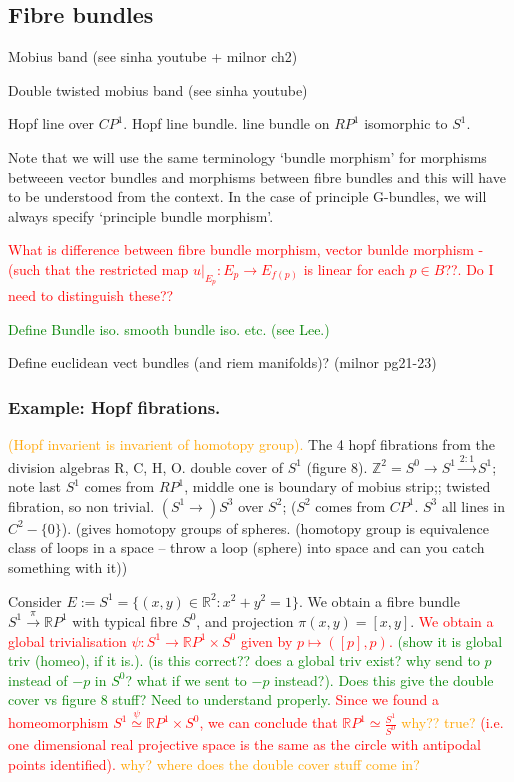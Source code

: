 \documentclass[a4paper]{article}
\theoremstyle{definition} \newtheorem*{definition}{Definition}
\theoremstyle{definition} \newtheorem*{definitions}{Definitions}
\theoremstyle{plain} \newtheorem{theorem}{Theorem}[section]
\theoremstyle{plain} \newtheorem{proposition}[theorem]{Proposition}
\theoremstyle{plain} \newtheorem{corollary}[theorem]{Corollary}
\theoremstyle{plain} \newtheorem{lemma}[theorem]{Lemma}
\theoremstyle{plain} \newtheorem{example}[theorem]{Example}
\newcommand{\checkCorrect}[1]{\textcolor{red}{#1}}
\newcommand{\understandBetter}[1]{\textcolor{orange}{#1}}
\newcommand{\question}[1]{\textcolor{orange}{#1}}
\newcommand{\finish}[1]{\textcolor{green}{#1}}
\newcommand{\realnos}{\mathbb{R}}
\begin{document}
\subsection{Fibre bundles}
Mobius band (see sinha youtube + milnor ch2)

Double twisted mobius band (see sinha youtube)

Hopf line over $CP^1$. 
Hopf line bundle. 
line bundle on $RP^1$ isomorphic to $S^1$. 


Note that we will use the same terminology `bundle morphism' for morphisms betweeen vector bundles and morphisms between fibre bundles and this will have to be understood from the context. In the case of principle G-bundles, we will always specify `principle bundle morphism'.


\checkCorrect{What is difference between fibre bundle morphism, vector bunlde morphism - (such that the restricted map $u\vert_{E_p}: E_p \rightarrow E_{f(p)}$ is linear for each $p\in B$??. Do I need to distinguish these??}

\finish{Define Bundle iso. smooth bundle iso. etc. (see Lee.)}


Define euclidean vect bundles (and riem manifolds)? (milnor pg21-23)

\subsubsection{Example: Hopf fibrations.}

\understandBetter{(Hopf invarient is invarient of homotopy group).}
The 4 hopf fibrations from the division algebras R, C, H, O.
double cover of $S^1$ (figure 8). 
$\mathbb{Z}^2 = S^0 \to S^1 \xrightarrow{2:1} S^1$; note last $S^1$ comes from $RP^1$, middle one is boundary of mobius strip;; twisted fibration, so non trivial.
$(S^1\to) S^3$ over $S^2$; ($S^2$ comes from $CP^1$. $S^3$ all lines in $C^2 - \{0\}$).
(gives homotopy groups of spheres. (homotopy group is equivalence class of loops in a space -- throw a loop (sphere) into space and can you catch something with it))

 Consider $E:=S^1=\{(x,y)\in \realnos^2:x^2+y^2=1\}$. We obtain a fibre bundle $S^1\xrightarrow{\pi} \realnos P^1$ with typical fibre $S^0$, and projection $\pi(x, y)=[x, y]$. \checkCorrect{We obtain a global trivialisation $\psi:S^1\to \realnos P^1\times S^0$ given by $p\mapsto ([p], p)$.} \finish{(show it is global triv (homeo), if it is.). (is this correct?? does a global triv exist? why send to $p$ instead of $-p$ in $S^0$? what if we sent to $-p$ instead?). Does this give the double cover vs figure 8 stuff? Need to understand properly.} \checkCorrect{Since we found a homeomorphism $S^1\overset{\psi}{\simeq} \realnos P^1\times S^0$, we can conclude that $\realnos P^1 \simeq \frac{S^1}{S^0}$ \question{why?? true?} (i.e. one dimensional real projective space is the same as the circle with antipodal points identified). \question{why?}} \question{where does the double cover stuff come in?}
\end{document}
